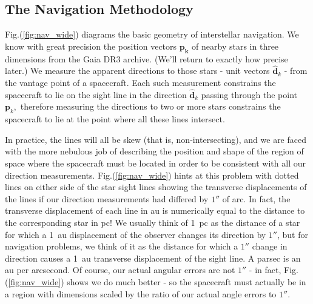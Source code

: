 \documentclass[]{aastex63}
\newcommand{\BV}[1]{\mathbf{#1}}
\newcommand{\BH}[1]{\hat{\mathbf{#1}}}
\begin{document}
\subsection{The Navigation Methodology}

Fig.(\ref{fig:nav_wide}) diagrams the basic geometry of interstellar navigation.  We know with great precision the position vectors $\BV{p_k}$ of nearby stars in three dimensions from the Gaia DR3 archive.  (We'll return to exactly how precise later.)  We measure the apparent directions to those stars - unit vectors $\BH{d}_k$ - from the vantage point of a spacecraft.  Each such measurement constrains the spacecraft to lie on the sight line in the direction $\BH{d}_k$ passing through the point $\BV{p}_k,$ therefore measuring the directions to two or more stars constrains the spacecraft to lie at the point where all these lines intersect.

In practice, the lines will all be skew (that is, non-intersecting), and we are faced with the more nebulous job of describing the position and shape of the region of space where the spacecraft must be located in order to be consistent with all our direction measurements. Fig.(\ref{fig:nav_wide}) hints at this problem with dotted lines on either side of the star sight lines showing the transverse displacements of the lines if our direction measurements had differed by $1''$ of arc.  In fact, the transverse displacement of each line in au is numerically equal to the distance to the corresponding star in pc!  We usually think of 1~pc as the distance of a star for which a 1~au displacement of the observer changes its direction by $1''$, but for navigation problems, we think of it as the distance for which a $1''$ change in direction causes a 1~au transverse displacement of the sight line.  A parsec is an au per arcsecond.  Of course, our actual angular errors are not $1''$ - in fact, Fig.(\ref{fig:nav_wide}) shows we do much better - so the spacecraft must actually be in a region with dimensions scaled by the ratio of our actual angle errors to $1''.$
\end{document}
